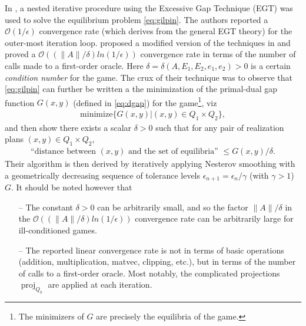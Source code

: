 \documentclass[a4paper,9pt]{extarticle}
\DeclareMathOperator{\proj}{proj}
\begin{document}
In \cite{hoda2010smoothing}, a nested iterative procedure using the
Excessive Gap Technique (EGT) \cite{nesterov2005excessive} was used
to solve the equilibrium problem \eqref{eq:gilpin}.
The authors reported a $\mathcal{O}(1/\epsilon)$ convergence rate
(which derives from the general EGT theory) for the outer-most
iteration loop.
\cite{gilpinfirst} proposed a modified version of the techniques in
\cite{hoda2010smoothing} and  proved a $\mathcal{O}\left(\left(\|A\| /
\delta\right) ln\left(1 / \epsilon\right)\right)$ convergence rate in
terms of the number of calls made to a first-order oracle. Here
$\delta = \delta(A, E_1, E_2, e_1, e_2) > 0$ is a certain
\textit{condition number} for the game. The crux of their technique was to
observe that \eqref{eq:gilpin} can further be written a the minimization of
the primal-dual gap function $G(x, y)$ (defined in \eqref{eq:dgap})
for the game\footnote{The minimizers of $G$ are precisely the
  equilibria of the game.}, viz
\begin{eqnarray}
\mathrm{minimize}\{G(x,y)|(x,y) \in Q_1 \times Q_2\},
\end{eqnarray}
and then show there exists a scalar
$\delta > 0$ such that for any pair of realization plans $(x, y) \in Q_1 \times Q_2$,
\begin{eqnarray}
\text{``distance between }(x, y)\text{ and the set of
equilibria'' } \le G(x, y)/\delta.
\end{eqnarray}
Their
algorithm is then derived by iteratively applying Nesterov smoothing \cite{nesterov2005a}
with a geometrically decreasing sequence of tolerance levels
$\epsilon_{n+1} = \epsilon_n / \gamma$ (with $\gamma > 1$)  $G$. It
should be noted however that
\begin{itemize}
\item[--] The constant $\delta > 0$ can be arbitrarily small, and so
  the factor $\|A\| / \delta$ in the $\mathcal{O}\left(\left(\|A\| /
\delta\right) ln\left(1 / \epsilon\right)\right)$ convergence rate can
be arbitrarily large for ill-conditioned games.
\item[--] The reported linear convergence rate is not in terms of
  basic operations (addition, multiplication, matvec, clipping, etc.),
  but in terms of the number of calls to a first-order oracle. Most
  notably, the complicated projections $\proj_{Q_k}$ are applied at
  each iteration.%

\end{itemize}
\end{document}
